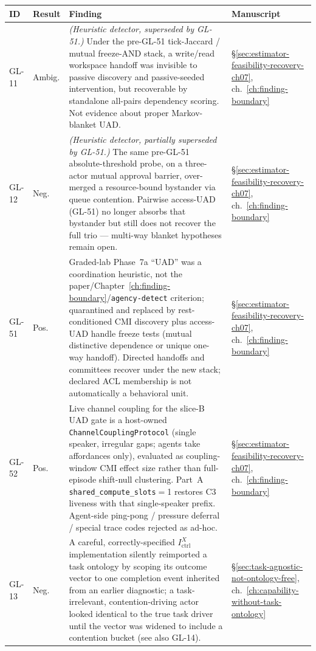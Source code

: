 \begin{longtable}{@{}L{0.05\textwidth}L{0.08\textwidth}L{0.55\textwidth}L{0.255\textwidth}@{}}
\toprule
\textbf{ID} & \textbf{Result} & \textbf{Finding} & \textbf{Manuscript} \\
\midrule
\endhead
\bottomrule
\endfoot
\label{finding:gl-11}GL-11 & Ambig. & \emph{(Heuristic detector, superseded by GL-51.)} Under the pre-GL-51 tick-Jaccard / mutual freeze-AND stack, a write/read workspace handoff was invisible to passive discovery and passive-seeded intervention, but recoverable by standalone all-pairs dependency scoring. Not evidence about proper Markov-blanket UAD. & \S\ref{sec:estimator-feasibility-recovery-ch07}, ch.~\ref{ch:finding-boundary} \\
\label{finding:gl-12}GL-12 & Neg. & \emph{(Heuristic detector, partially superseded by GL-51.)} The same pre-GL-51 absolute-threshold probe, on a three-actor mutual approval barrier, over-merged a resource-bound bystander via queue contention. Pairwise access-UAD (GL-51) no longer absorbs that bystander but still does not recover the full trio --- multi-way blanket hypotheses remain open. & \S\ref{sec:estimator-feasibility-recovery-ch07}, ch.~\ref{ch:finding-boundary} \\
\label{finding:gl-51}GL-51 & Pos. & Graded-lab Phase~7a ``UAD'' was a coordination heuristic, not the paper/Chapter~\ref{ch:finding-boundary}/\texttt{agency-detect} criterion; quarantined and replaced by rest-conditioned CMI discovery plus access-UAD handle freeze tests (mutual distinctive dependence or unique one-way handoff). Directed handoffs and committees recover under the new stack; declared ACL membership is not automatically a behavioral unit. & \S\ref{sec:estimator-feasibility-recovery-ch07}, ch.~\ref{ch:finding-boundary} \\
\label{finding:gl-52}GL-52 & Pos. & Live channel coupling for the slice-B UAD gate is a host-owned \texttt{ChannelCouplingProtocol} (single speaker, irregular gaps; agents take affordances only), evaluated as coupling-window CMI effect size rather than full-episode shift-null clustering. Part~A \texttt{shared\_compute\_slots}${}={}$1 restores C3 liveness with that single-speaker prefix. Agent-side ping-pong / pressure deferral / special trace codes rejected as ad-hoc. & \S\ref{sec:estimator-feasibility-recovery-ch07}, ch.~\ref{ch:finding-boundary} \\
\label{finding:gl-13}GL-13 & Neg. & A careful, correctly-specified $I_{\mathrm{ctrl}}^X$ implementation silently reimported a task ontology by scoping its outcome vector to one completion event inherited from an earlier diagnostic; a task-irrelevant, contention-driving actor looked identical to the true task driver until the vector was widened to include a contention bucket (see also GL-14). & \S\ref{sec:task-agnostic-not-ontology-free}, ch.~\ref{ch:capability-without-task-ontology} \\

\end{longtable}
